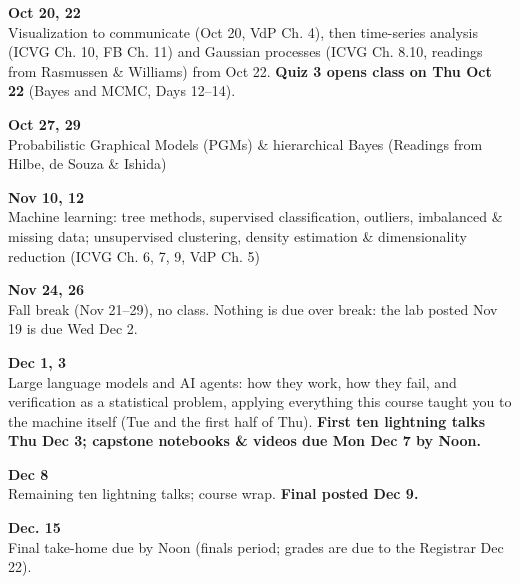 \begin{innerlist}
\item[] \smallskip

\item {\bf\headerfont\color{RoyalBlue} Oct 20, 22}\\ Visualization to communicate (Oct 20, VdP Ch. 4), then time-series analysis (ICVG Ch. 10, FB Ch. 11) and Gaussian processes (ICVG Ch. 8.10, readings from Rasmussen \& Williams) from Oct 22. {\bf Quiz 3 opens class on Thu Oct 22} (Bayes and MCMC, Days 12--14).\smallskip

\item {\bf\headerfont\color{RoyalBlue} Oct 27, 29}\\ Probabilistic Graphical Models (PGMs) \& hierarchical Bayes (Readings from Hilbe, de Souza \& Ishida)\smallskip

\item[] \smallskip

\item {\bf\headerfont\color{RoyalBlue} Nov 10, 12}\\ Machine learning: tree methods, supervised classification, outliers, imbalanced \& missing data; unsupervised clustering, density estimation \& dimensionality reduction (ICVG Ch. 6, 7, 9, VdP Ch. 5)\smallskip

\item[] \smallskip

\item {\bf\headerfont\color{RoyalBlue} Nov 24, 26}\\ {\color{Red} Fall break (Nov 21--29), no class.} Nothing is due over break: the lab posted Nov 19 is due Wed Dec 2.\smallskip

\item {\bf\headerfont\color{RoyalBlue} Dec 1, 3}\\ Large language models and AI agents: how they work, how they fail, and verification as a statistical problem, applying everything this course taught you to the machine itself (Tue and the first half of Thu). {\bf First ten lightning talks Thu Dec 3; capstone notebooks \& videos due Mon Dec 7 by Noon.}\smallskip

\item {\bf\headerfont\color{RoyalBlue} Dec 8}\\ Remaining ten lightning talks; course wrap. {\bf Final posted Dec 9.}\smallskip

\item {\bf\headerfont\color{Red} Dec. 15\nth}\\ Final take-home due by Noon (finals period; grades are due to the Registrar Dec 22).\smallskip
\end{innerlist}
\smallskip
